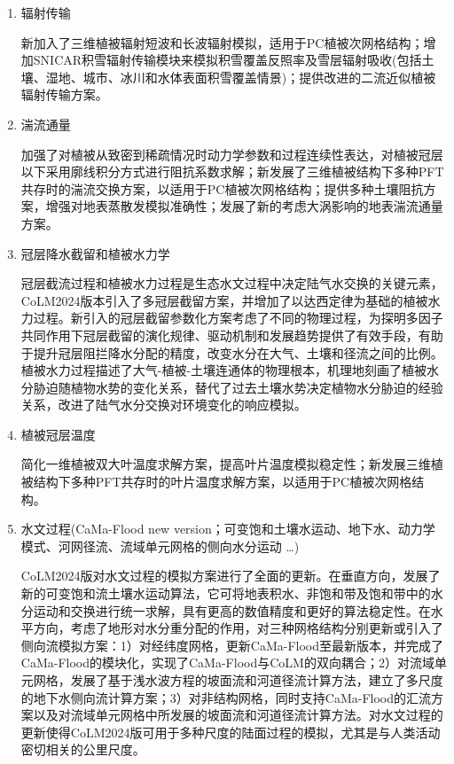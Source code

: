 \begin{enumerate}[label={\arabic*)}]
    \item 辐射传输

    新加入了三维植被辐射短波\citep{yuan20143d}和长波辐射模拟，适用于PC植被次网格结构\citep{dai2019different}；增加SNICAR积雪辐射传输模块来模拟积雪覆盖反照率及雪层辐射吸收(包括土壤、湿地、城市、冰川和水体表面积雪覆盖情景)；提供改进的二流近似植被辐射传输方案\citep{yuan2017reexamination}。
    
    \item 湍流通量

    加强了对植被从致密到稀疏情况时动力学参数和过程连续性表达，对植被冠层以下采用廓线积分方式进行阻抗系数求解；新发展了三维植被结构下多种PFT共存时的湍流交换方案，以适用于PC植被次网格结构；提供多种土壤阻抗方案，增强对地表蒸散发模拟准确性；发展了新的考虑大涡影响的地表湍流通量方案。
    
    \item 冠层降水截留和植被水力学

    冠层截流过程和植被水力过程是生态水文过程中决定陆气水交换的关键元素，CoLM2024版本引入了多冠层截留方案，并增加了以达西定律为基础的植被水力过程。新引入的冠层截留参数化方案考虑了不同的物理过程，为探明多因子共同作用下冠层截留的演化规律、驱动机制和发展趋势提供了有效手段，有助于提升冠层阻拦降水分配的精度，改变水分在大气、土壤和径流之间的比例。植被水力过程描述了大气-植被-土壤连通体的物理根本，机理地刻画了植被水分胁迫随植物水势的变化关系，替代了过去土壤水势决定植物水分胁迫的经验关系，改进了陆气水分交换对环境变化的响应模拟。

    \item 植被冠层温度

    简化一维植被双大叶温度求解方案，提高叶片温度模拟稳定性；新发展三维植被结构下多种PFT共存时的叶片温度求解方案，以适用于PC植被次网格结构。
    
    \item 水文过程(CaMa-Flood new version；可变饱和土壤水运动、地下水、动力学模式、河网径流、流域单元网格的侧向水分运动 …)

    CoLM2024版对水文过程的模拟方案进行了全面的更新。在垂直方向，发展了新的可变饱和流土壤水运动算法，它可将地表积水、非饱和带及饱和带中的水分运动和交换进行统一求解，具有更高的数值精度和更好的算法稳定性。在水平方向，考虑了地形对水分重分配的作用，对三种网格结构分别更新或引入了侧向流模拟方案：1）对经纬度网格，更新CaMa-Flood至最新版本，并完成了CaMa-Flood的模块化，实现了CaMa-Flood与CoLM的双向耦合；2）对流域单元网格，发展了基于浅水波方程的坡面流和河道径流计算方法，建立了多尺度的地下水侧向流计算方案；3）对非结构网格，同时支持CaMa-Flood的汇流方案以及对流域单元网格中所发展的坡面流和河道径流计算方法。对水文过程的更新使得CoLM2024版可用于多种尺度的陆面过程的模拟，尤其是与人类活动密切相关的公里尺度。
    

\end{enumerate}
